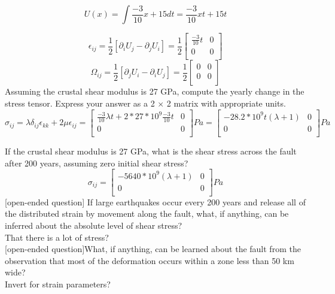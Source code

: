 \documentclass{article}
\begin{document}
\[
U\left(x\right) = \int{ \frac{-3}{10}x + 15 dt } = \frac{-3}{10}xt + 15t
\]

\[
\epsilon_{ij} = \frac{1}{2}  \left[ \partial_{i} U_{j} - \partial_{j} U_{i} \right] = 
\frac{1}{2}  
  \left[ {\begin{array}{cc}
    \frac{-3}{10}t & 0 \\
    0 & 0 \\
  \end{array} }
  \right]
\]
\[
\Omega_{ij} = \frac{1}{2} \left[ \partial_{j}U_{i} - \partial_{i}U_{j} \right] = \frac{1}{2}  
  \left[ {\begin{array}{cc}
    0 & 0 \\
    0 & 0 \\
  \end{array} }
  \right]
\]
Assuming the crustal shear modulus is 27 GPa, compute the yearly change in the stress tensor. Express your answer as a 2 × 2 matrix with appropriate units.
\[
\sigma_{ij} = \lambda \delta_{ij} \epsilon_{kk} + 2\mu \epsilon_{ij} =   \left[ {\begin{array}{cc}
     \frac{-3}{10} \lambda t + 2 * 27*10^{9} \frac{-3}{10}t & 0 \\
    0 & 0 \\
  \end{array} }
  \right] Pa = \left[ {\begin{array}{cc}
    -28.2 * 10^{9}t \left( \lambda  + 1\right)  & 0 \\
    0 & 0 \\
  \end{array} }
  \right] Pa
\]



If the crustal shear modulus is 27 GPa, what is the shear stress across the fault after 200 years, assuming zero initial shear stress?
\[
\sigma_{ij} = \left[ {\begin{array}{cc}
    -5640 * 10^{9} \left( \lambda  + 1\right)  & 0 \\
    0 & 0 \\
  \end{array} }
  \right] Pa
\]
[open-ended question] If large earthquakes occur every 200 years and release all of the distributed strain by movement along the fault, what, if anything, can be inferred about the absolute level of shear stress?\\

That there is a lot of stress?\\

[open-ended question]What, if anything, can be learned about the fault from the observation that most of the deformation occurs within a zone less than 50 km wide? \\

Invert for strain parameters?
\end{document}
